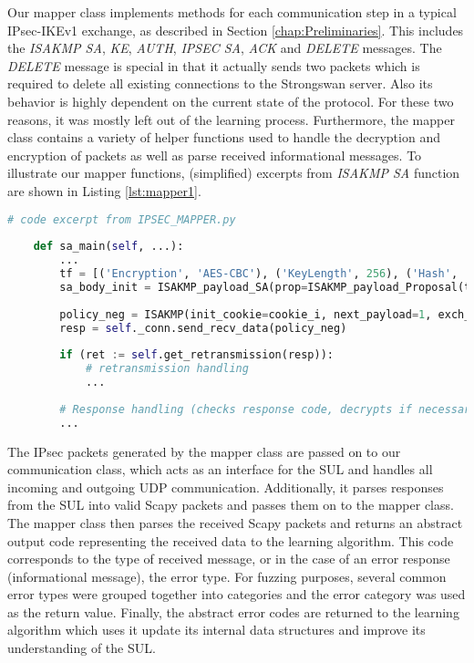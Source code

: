 Our mapper class implements methods for each communication step in a typical IPsec-IKEv1 exchange, as described in Section \ref{chap:Preliminaries}. This includes the \emph{ISAKMP SA}, \emph{KE}, \emph{AUTH}, \emph{IPSEC SA}, \emph{ACK} and \emph{DELETE} messages. The \emph{DELETE} message is special in that it actually sends two packets which is required to delete all existing connections to the Strongswan server. Also its behavior is highly dependent on the current state of the protocol. For these two reasons, it was mostly left out of the learning process. Furthermore, the mapper class contains a variety of helper functions used to handle the decryption and encryption of packets as well as parse received informational messages. To illustrate our mapper functions, (simplified) excerpts from \emph{ISAKMP SA} function are shown in Listing \ref{lst:mapper1}.

\begin{lstlisting}[float=ht, caption=Mapper ex1, label=lst:mapper1, numbers=none, language=python]
	# code excerpt from IPSEC_MAPPER.py
	
	def sa_main(self, ...):
		...
		tf = [('Encryption', 'AES-CBC'), ('KeyLength', 256), ('Hash', 'SHA'), ('GroupDesc', '1024MODPgr'), ('Authentication', 'PSK'), ('LifeDuration', 28800)]
		sa_body_init = ISAKMP_payload_SA(prop=ISAKMP_payload_Proposal(trans_nb=1, trans=ISAKMP_payload_Transform(num=1, transforms=tf)))
		
		policy_neg = ISAKMP(init_cookie=cookie_i, next_payload=1, exch_type=2)/sa_body_init
		resp = self._conn.send_recv_data(policy_neg)
		
		if (ret := self.get_retransmission(resp)): 
			# retransmission handling
			...
		
		# Response handling (checks response code, decrypts if necessary, updates relevant local values)
		...
\end{lstlisting}

The IPsec packets generated by the mapper class are passed on to our communication class, which acts as an interface for the SUL and handles all incoming and outgoing UDP communication. Additionally, it parses responses from the SUL into valid Scapy packets and passes them on to the mapper class. The mapper class then parses the received Scapy packets and returns an abstract output code representing the received data to the learning algorithm. This code corresponds to the type of received message, or in the case of an error response (informational message), the error type. For fuzzing purposes, several common error types were grouped together into categories and the error category was used as the return value. Finally, the abstract error codes are returned to the learning algorithm which uses it update its internal data structures and improve its understanding of the SUL. \\


